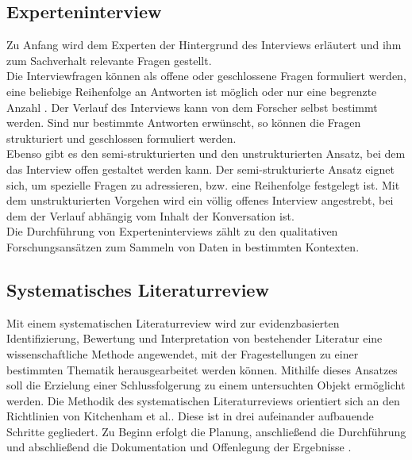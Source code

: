     \subsection{Experteninterview}
    \label{subsec:experteninterview}
        Zu Anfang wird dem Experten der Hintergrund des Interviews erläutert und ihm zum Sachverhalt relevante Fragen gestellt. 
        \\
        \linebreak
        Die Interviewfragen können als offene oder geschlossene Fragen formuliert werden, eine beliebige Reihenfolge an Antworten ist 
        möglich oder nur eine begrenzte Anzahl \cite{robson2002real}. Der Verlauf des Interviews 
        kann von dem Forscher selbst bestimmt werden. Sind nur bestimmte Antworten erwünscht, so können die Fragen strukturiert und 
        geschlossen formuliert werden. 
        \\
        Ebenso gibt es den semi-strukturierten und den unstrukturierten Ansatz, bei dem das Interview 
        offen gestaltet werden kann. Der semi-strukturierte Ansatz eignet sich, um spezielle Fragen zu adressieren, bzw. eine 
        Reihenfolge festgelegt ist. Mit dem unstrukturierten Vorgehen wird 
        ein völlig offenes Interview angestrebt, bei dem der Verlauf abhängig vom Inhalt der Konversation ist.
        \\
        Die Durchführung von Experteninterviews zählt zu den qualitativen Forschungsansätzen zum Sammeln von Daten in bestimmten Kontexten. 

    \subsection{Systematisches Literaturreview}
    \label{subsec:systematischesliteraturreview}
        Mit einem systematischen Literaturreview wird zur evidenzbasierten Identifizierung, Bewertung und Interpretation  
        von bestehender Literatur eine wissenschaftliche Methode angewendet, mit der Fragestellungen zu einer bestimmten Thematik 
        herausgearbeitet werden können. Mithilfe dieses Ansatzes soll die Erzielung einer Schlussfolgerung zu einem untersuchten Objekt 
        ermöglicht werden. 
        Die Methodik des systematischen Literaturreviews orientiert sich an den Richtlinien von Kitchenham et al.. Diese ist in drei 
        aufeinander aufbauende Schritte gegliedert. Zu Beginn erfolgt die Planung, anschließend die Durchführung und abschließend die 
        Dokumentation und Offenlegung der Ergebnisse \cite{Kitchenham2007}.

